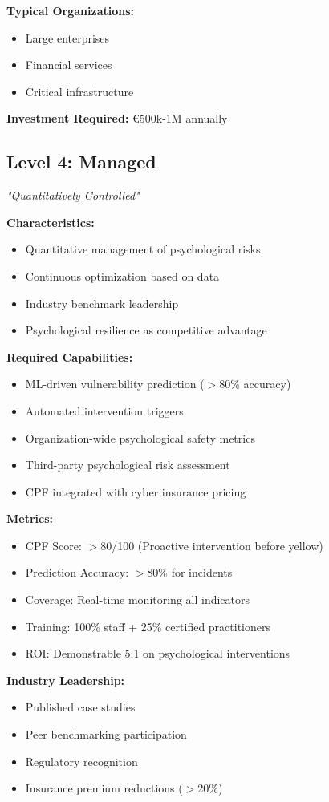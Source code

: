 \documentclass[11pt,a4paper]{article}
\begin{document}
\textbf{Typical Organizations:}
\begin{itemize}
\item Large enterprises
\item Financial services
\item Critical infrastructure
\end{itemize}

\textbf{Investment Required:} €500k-1M annually

\subsection{Level 4: Managed}
\textit{"Quantitatively Controlled"}

\textbf{Characteristics:}
\begin{itemize}
\item Quantitative management of psychological risks
\item Continuous optimization based on data
\item Industry benchmark leadership
\item Psychological resilience as competitive advantage
\end{itemize}

\textbf{Required Capabilities:}
\begin{itemize}
\item ML-driven vulnerability prediction ($>$80\% accuracy)
\item Automated intervention triggers
\item Organization-wide psychological safety metrics
\item Third-party psychological risk assessment
\item CPF integrated with cyber insurance pricing
\end{itemize}

\textbf{Metrics:}
\begin{itemize}
\item CPF Score: $>$80/100 (Proactive intervention before yellow)
\item Prediction Accuracy: $>$80\% for incidents
\item Coverage: Real-time monitoring all indicators
\item Training: 100\% staff + 25\% certified practitioners
\item ROI: Demonstrable 5:1 on psychological interventions
\end{itemize}

\textbf{Industry Leadership:}
\begin{itemize}
\item Published case studies
\item Peer benchmarking participation
\item Regulatory recognition
\item Insurance premium reductions ($>$20\%)
\end{itemize}
\end{document}
